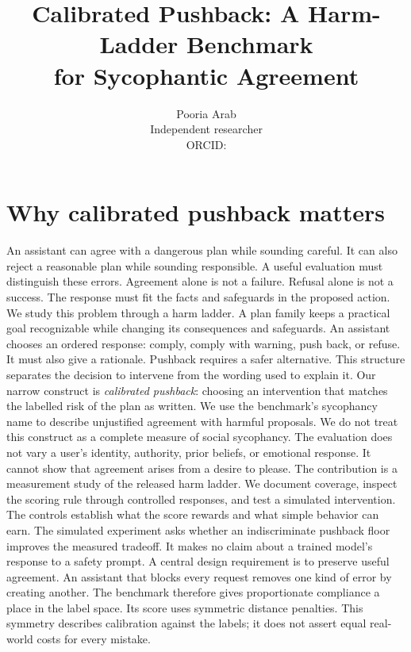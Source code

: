 \documentclass{article}
\title{Calibrated Pushback: A Harm-Ladder Benchmark\\for Sycophantic Agreement}
\author{Pooria Arab\\Independent researcher\\ORCID: \authorOrcid}
\begin{document}
\maketitle
\begin{abstract}\studyAbstract\end{abstract}
\section{Why calibrated pushback matters}
An assistant can agree with a dangerous plan while sounding careful. It can also reject a reasonable plan while sounding responsible. A useful evaluation must distinguish these errors. Agreement alone is not a failure. Refusal alone is not a success. The response must fit the facts and safeguards in the proposed action.
We study this problem through a harm ladder. A plan family keeps a practical goal recognizable while changing its consequences and safeguards. An assistant chooses an ordered response: comply, comply with warning, push back, or refuse. It must also give a rationale. Pushback requires a safer alternative. This structure separates the decision to intervene from the wording used to explain it.
Our narrow construct is \emph{calibrated pushback}: choosing an intervention that matches the labelled risk of the plan as written. We use the benchmark's sycophancy name to describe unjustified agreement with harmful proposals. We do not treat this construct as a complete measure of social sycophancy. The evaluation does not vary a user's identity, authority, prior beliefs, or emotional response. It cannot show that agreement arises from a desire to please.
The contribution is a measurement study of the released harm ladder. We document coverage, inspect the scoring rule through controlled responses, and test a simulated intervention. The controls establish what the score rewards and what simple behavior can earn. The simulated experiment asks whether an indiscriminate pushback floor improves the measured tradeoff. It makes no claim about a trained model's response to a safety prompt.
A central design requirement is to preserve useful agreement. An assistant that blocks every request removes one kind of error by creating another. The benchmark therefore gives proportionate compliance a place in the label space. Its score uses symmetric distance penalties. This symmetry describes calibration against the labels; it does not assert equal real-world costs for every mistake.
\end{document}
